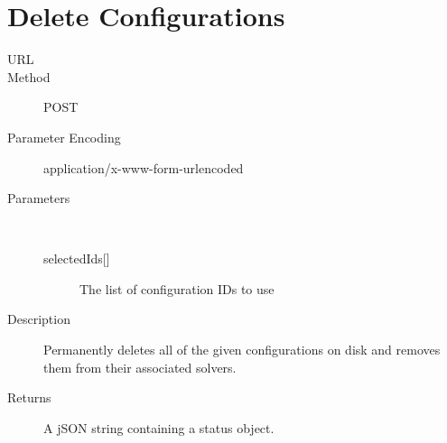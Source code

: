\section{Delete Configurations}
\begin{description}
\item [URL] 
\item [Method] POST
\item [Parameter Encoding] application/x-www-form-urlencoded
\item [Parameters] \
	\begin{description}
	\item [{selectedIds[]}]  The list of configuration IDs to use
	\end{description}
\item [Description] Permanently deletes all of the given configurations on disk and removes them from their associated solvers.
\item [Returns] A jSON string containing a status object.
\end{description}
